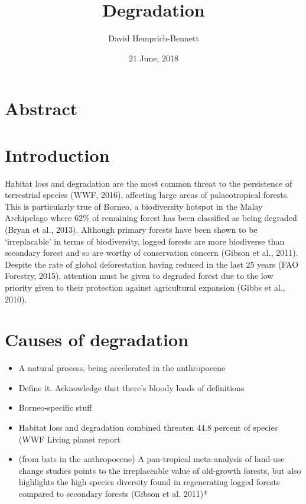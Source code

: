 \documentclass[]{article}
\title{Degradation}
\author{David Hemprich-Bennett}
\date{21 June, 2018}
\providecommand{\tightlist}{%
  \setlength{\itemsep}{0pt}\setlength{\parskip}{0pt}}
\begin{document}
\maketitle

\section{Abstract}\label{abstract}

\section{Introduction}\label{introduction}

Habitat loss and degradation are the most common threat to the
persistence of terrestrial species (WWF, 2016), affecting large areas of
palaeotropical forests. This is particularly true of Borneo, a
biodiversity hotspot in the Malay Archipelago where 62\% of remaining
forest has been classified as being degraded (Bryan et al., 2013).
Although primary forests have been shown to be `irreplacable' in terms
of biodiversity, logged forests are more biodiverse than secondary
forest and so are worthy of conservation concern (Gibson et al., 2011).
Despite the rate of global deforestation having reduced in the last 25
years (FAO Forestry, 2015), attention must be given to degraded forest
due to the low priority given to their protection against agricultural
expansion (Gibbs et al., 2010).

\section{Causes of degradation}\label{causes-of-degradation}

\begin{itemize}
\tightlist
\item
  A natural process, being accelerated in the anthropocene
\item
  Define it. Acknowledge that there's bloody loads of definitions
\item
  Borneo-specific stuff
\item
  Habitat loss and degradation combined threaten 44.8 percent of species
  (WWF Living planet report
\item
  (from bats in the anthropocene) A pan-tropical meta-analysis of
  land-use change studies points to the irreplaceable value of
  old-growth forests, but also highlights the high species diversity
  found in regenerating logged forests compared to secondary forests
  (Gibson et al. 2011)*
\end{itemize}
\end{document}
